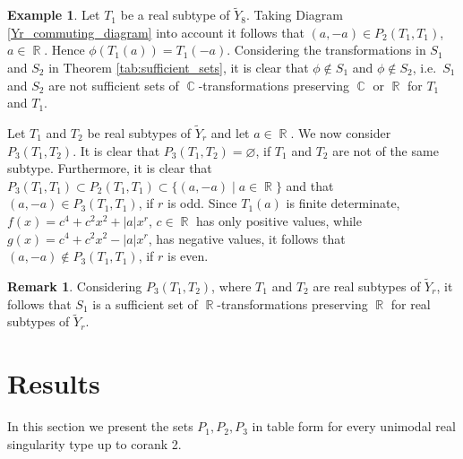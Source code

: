 \documentclass[noend]{amsproc}
\theoremstyle{definition}
\newtheorem{remark}[theorem]{Remark}
\newtheorem{example}[theorem]{Example}
\DeclareMathOperator{\R}{\mathbb{R}}
\DeclareMathOperator{\C}{\mathbb{C}}
\begin{document}
\begin{example}\label{tab:counter_example_Yr}
Let $T_1$ be a real subtype of $\widetilde Y_8$. Taking Diagram \ref{Yr_commuting_diagram} into account it follows that $(a,-a)\in P_2(T_1,T_1)$, $a\in\R$. Hence $\phi(T_1(a))=T_1(-a)$. Considering the transformations in $S_1$ and $S_2$ in Theorem \ref{tab:sufficient_sets}, it is clear that $\phi\not\in S_1$ and $\phi\not\in S_2$, i.e.~$S_1$ and $S_2$ are not sufficient sets of $\C$-transformations preserving $\C$ or $\R$ for $T_1$ and $T_1$.
\end{example}

Let $T_1$ and $T_2$ be real subtypes of $\widetilde Y_r$ and let $a\in\R$. We now consider $P_3(T_1,T_2)$. It is clear that $P_3(T_1,T_2)=\varnothing$, if $T_1$ and $T_2$ are not of the same subtype. Furthermore, it is clear that $P_3(T_1,T_1)\subset P_2(T_1,T_1)\subset\{(a,-a)\mid a\in\R\}$ and that $(a,-a)\in P_3(T_1,T_1)$, if $r$ is odd. Since $T_1(a)$ is finite determinate, $f(x)=c^4+c^2x^2+|a|x^r$, $c\in\R$ has only positive values, while $g(x)=c^4+c^2x^2-|a|x^r$, has negative values, it follows that $(a,-a)\not\in P_3(T_1,T_1)$, if $r$ is even. 

\begin{remark}
Considering $P_3(T_1,T_2)$, where $T_1$ and $T_2$ are real subtypes of $\widetilde Y_r$, it follows that $S_1$ is a sufficient set of $\R$-transformations preserving $\R$ for real subtypes of $\widetilde Y_r$. 
\end{remark}
\section{Results}
In this section we present the sets $P_1,P_2,P_3$ in table form for every unimodal real singularity type up to corank 2.
\end{document}
